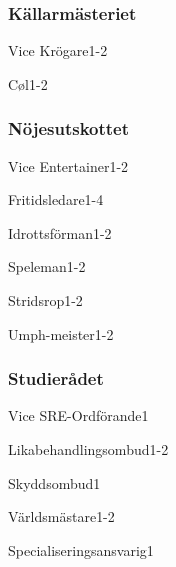 \documentclass[10pt]{article}
\begin{document}
\subsubsection{Källarmästeriet}
\begin{vallista}
    \begin{post}{Vice Krögare}{1-2}
    \end{post}
    \begin{post}{Cøl}{1-2}
    \end{post}
\end{vallista}

\subsubsection{Nöjesutskottet}
\begin{vallista}
    \begin{post}{Vice Entertainer}{1-2}
    \end{post}
    \begin{post}{Fritidsledare}{1-4}
    \end{post}
    \begin{post}{Idrottsförman}{1-2}
    \end{post}
    \begin{post}{Speleman}{1-2}
    \end{post}
    \begin{post}{Stridsrop}{1-2}
    \end{post}
    \begin{post}{Umph-meister}{1-2}
    \end{post}
\end{vallista}

\subsubsection{Studierådet}
\begin{vallista}
    \begin{post}{Vice SRE-Ordförande}{1}
    \end{post}
    \begin{post}{Likabehandlingsombud}{1-2}
    \end{post}
    \begin{post}{Skyddsombud}{1}
    \end{post}
    \begin{post}{Världsmästare}{1-2}
    \end{post}
    \begin{post}{Specialiseringsansvarig}{1}
    \end{post}
\end{vallista}
\end{document}

